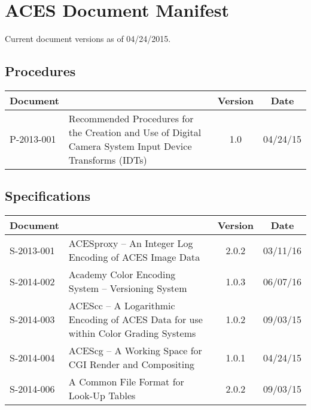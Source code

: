 \documentclass[10pt]{academydoc}
\begin{document}
\regularsectionformat

\section*{ACES Document Manifest}
Current document versions as of 04/24/2015.

\subsection*{Procedures}
\begin{tabularx}{\linewidth}{|l X|c|c|}
\hline
\textbf{Document} & & \textbf{Version} & \textbf{Date} \\ \hline
P-2013-001 & Recommended Procedures for the Creation and Use of Digital Camera System Input Device Transforms (IDTs) & 1.0 & 04/24/15 \\ \hline
\end{tabularx}

\subsection*{Specifications}
\begin{tabularx}{\linewidth}{|l X|c|c|}
\hline
\textbf{Document} & & \textbf{Version} & \textbf{Date} \\ \hline
S-2013-001 & ACESproxy -- An Integer Log Encoding of ACES Image Data & 2.0.2 & 03/11/16 \\ \hline
S-2014-002 & Academy Color Encoding System -- Versioning System & 1.0.3 & 06/07/16 \\ \hline
S-2014-003 & ACEScc -- A Logarithmic Encoding of ACES Data for use within Color Grading Systems & 1.0.2 & 09/03/15 \\ \hline
S-2014-004 & ACEScg -- A Working Space for CGI Render and Compositing & 1.0.1 & 04/24/15 \\ \hline
S-2014-006 & A Common File Format for Look-Up Tables & 2.0.2 & 09/03/15 \\ \hline
\end{tabularx}
\end{document}
